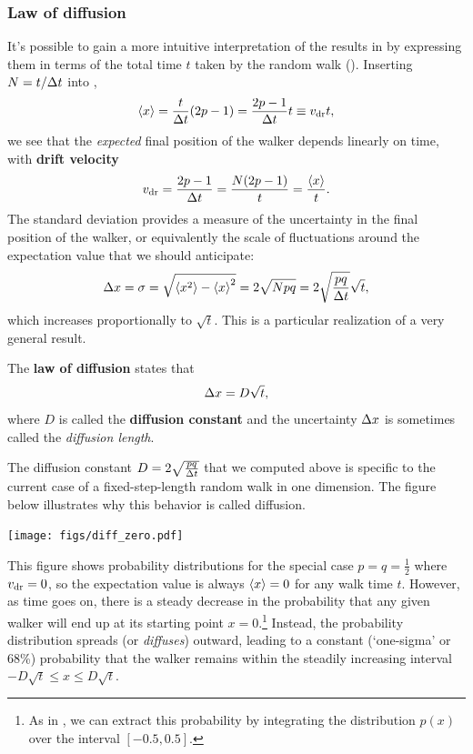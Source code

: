 \subsubsection{Law of diffusion}
It's possible to gain a more intuitive interpretation of the results in  by expressing them in terms of the total time $t$ taken by the random walk ().
Inserting $N = t / \Delta t$ into ,
\begin{equation*}
  \left\langle x \right\rangle = \frac{t}{\Delta t} (2p - 1) = \frac{2p - 1}{\Delta t} t \equiv v_{\mathrm{dr}} t,
\end{equation*}
we see that the \textit{expected} final position of the walker depends linearly on time, with \textbf{drift velocity}
\begin{equation}
  v_{\mathrm{dr}} = \frac{2p - 1}{\Delta t} = \frac{N(2p - 1)}{t} = \frac{\left\langle x \right\rangle}{t}.
\end{equation}
The standard deviation provides a measure of the uncertainty in the final position of the walker, or equivalently the scale of fluctuations around the expectation value that we should anticipate:
\begin{equation*}
  \Delta x = \sigma = \sqrt{\left\langle x^2 \right\rangle - \left\langle x \right\rangle^2} = 2\sqrt{Npq} = 2\sqrt{\frac{pq}{\Delta t}} \sqrt{t},
\end{equation*}
which increases proportionally to $\sqrt{t}$.
This is a particular realization of a very general result.

\begin{shaded}
  The \textbf{law of diffusion} states that
  \begin{equation}
    \Delta x = D \sqrt{t},
  \end{equation}
  where $D$ is called the \textbf{diffusion constant} and the uncertainty $\Delta x$ is sometimes called the \textit{diffusion length}.
\end{shaded}

The diffusion constant $D = 2\sqrt{\frac{pq}{\Delta t}}$ that we computed above is specific to the current case of a fixed-step-length random walk in one dimension.
The figure below illustrates why this behavior is called diffusion.
\begin{center}
  \texttt{[image: figs/diff\_zero.pdf]}
\end{center}
This figure shows probability distributions for the special case $p = q = \frac{1}{2}$ where $v_{\mathrm{dr}} = 0$, so the expectation value is always $\left\langle x \right\rangle = 0$ for any walk time $t$.
However, as time goes on, there is a steady decrease in the probability that any given walker will end up at its starting point $x = 0$.\footnote{As in , we can extract this probability by integrating the distribution $p(x)$ over the interval $[-0.5, 0.5]$.}
Instead, the probability distribution spreads (or \textit{diffuses}) outward, leading to a constant (`one-sigma' or 68\%) probability that the walker remains within the steadily increasing interval $-D\sqrt{t} \leq x \leq D\sqrt{t}$.



